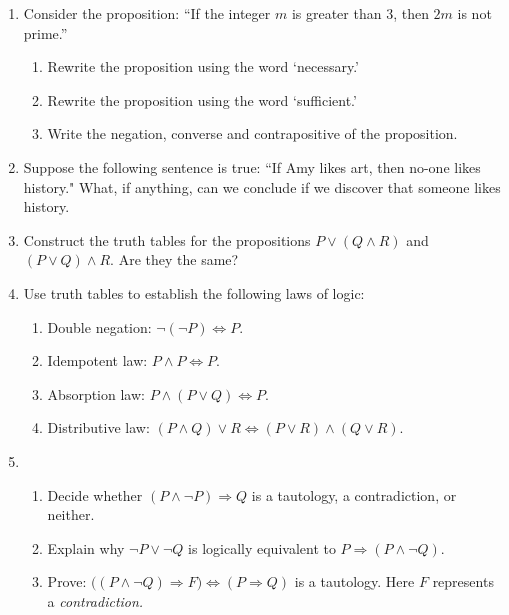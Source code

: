 \begin{exercises}{}{}
\begin{enumerate}
  
	  \item Consider the proposition: ``If the integer $m$ is greater than 3, then $2m$ is not prime.''
	  \begin{enumerate}
	    \item Rewrite the proposition using the word `necessary.'
	 		\item Rewrite the proposition using the word  `sufficient.'
	 		\item Write the negation, converse and contrapositive of the proposition. 
	  \end{enumerate}
	  

  \item Suppose the following sentence is true: ``If Amy likes art, then no-one likes history." What, if anything, can we conclude if we discover that someone likes history.
  
  
  \goodbreak
	  
	  
	  \item Construct the truth tables for the propositions $P\vee(Q\wedge R)$ and $(P\vee Q)\wedge R$. Are they the same?
   
   
  \goodbreak
  
	\item Use truth tables to establish the following laws of logic:
	\begin{enumerate}
	  \item Double negation: \lstsp $\neg(\neg P)\iff P$.
	  \item Idempotent law: \lstsp $P\wedge P\iff P$.
	  \item Absorption law: \lstsp $P\wedge(P\vee Q)\iff P$.
	  \item Distributive law: \lstsp $(P\wedge Q)\vee R\iff (P\vee R)\wedge(Q\vee R)$.
	\end{enumerate}
  
  
  \item\begin{enumerate}
    \item Decide whether $(P\wedge \neg P) \Longrightarrow Q$ is a tautology, a contradiction, or neither.
    \item Explain why $\neg P \vee \neg Q$ is logically equivalent to $P \Longrightarrow (P \wedge\neg Q)$.
    \item Prove: $\bigl((P\wedge \neg Q)\Longrightarrow F\bigr)\Longleftrightarrow  (P\Longrightarrow Q)$ is a tautology. Here $F$ represents a \emph{contradiction.}
  \end{enumerate}
  

\end{enumerate}
\end{exercises}

